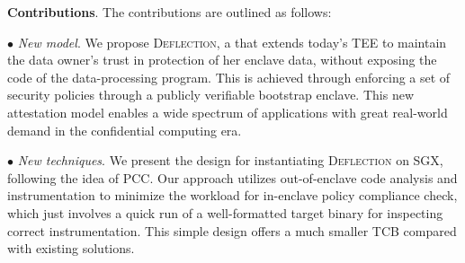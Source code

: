
\vspace{3pt}\noindent\textbf{Contributions}. The contributions are outlined as follows:

\vspace{3pt}\noindent$\bullet$\textit{ New model}. We propose \textsc{Deflection}, a  that extends today's TEE to maintain the data owner's trust in protection of her enclave data, without exposing the code of the data-processing program. This is achieved through enforcing a set of security policies through a publicly verifiable bootstrap enclave. This new attestation model enables a wide spectrum of applications with great real-world demand in the confidential computing era. 

\vspace{3pt}\noindent$\bullet$\textit{ New techniques}. We present the design for instantiating \textsc{Deflection} on SGX, following the idea of PCC. Our approach utilizes out-of-enclave code analysis and instrumentation to minimize the workload for in-enclave policy compliance check, which just involves a quick run of a well-formatted target binary for inspecting correct instrumentation. This simple design offers a much smaller TCB compared with existing solutions.   


